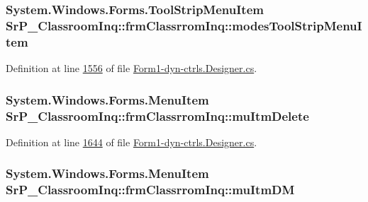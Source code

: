 \hypertarget{class_sr_p___classroom_inq_1_1frm_classrrom_inq_a8eef2c0ef527338feb8e51e6ddef9cc1}{
\subsubsection[{modes\-Tool\-Strip\-Menu\-Item}]{\setlength{\rightskip}{0pt plus 5cm}\-System.\-Windows.\-Forms.\-Tool\-Strip\-Menu\-Item {\bf \-Sr\-P\-\_\-\-Classroom\-Inq\-::frm\-Classrrom\-Inq\-::modes\-Tool\-Strip\-Menu\-Item}}}
\label{class_sr_p___classroom_inq_1_1frm_classrrom_inq_a8eef2c0ef527338feb8e51e6ddef9cc1}


\-Definition at line \hyperlink{_form1-dyn-ctrls_8_designer_8cs_source_l01556}{1556} of file \hyperlink{_form1-dyn-ctrls_8_designer_8cs_source}{\-Form1-\/dyn-\/ctrls.\-Designer.\-cs}.

\hypertarget{class_sr_p___classroom_inq_1_1frm_classrrom_inq_afb6bae444aa0f2084f3d447454a29e47}{
\subsubsection[{mu\-Itm\-Delete}]{\setlength{\rightskip}{0pt plus 5cm}\-System.\-Windows.\-Forms.\-Menu\-Item {\bf \-Sr\-P\-\_\-\-Classroom\-Inq\-::frm\-Classrrom\-Inq\-::mu\-Itm\-Delete}}}
\label{class_sr_p___classroom_inq_1_1frm_classrrom_inq_afb6bae444aa0f2084f3d447454a29e47}


\-Definition at line \hyperlink{_form1-dyn-ctrls_8_designer_8cs_source_l01644}{1644} of file \hyperlink{_form1-dyn-ctrls_8_designer_8cs_source}{\-Form1-\/dyn-\/ctrls.\-Designer.\-cs}.

\hypertarget{class_sr_p___classroom_inq_1_1frm_classrrom_inq_a1ab66b5e5506390fd7dab2fae510c610}{
\subsubsection[{mu\-Itm\-D\-M}]{\setlength{\rightskip}{0pt plus 5cm}\-System.\-Windows.\-Forms.\-Menu\-Item {\bf \-Sr\-P\-\_\-\-Classroom\-Inq\-::frm\-Classrrom\-Inq\-::mu\-Itm\-D\-M}}}
\label{class_sr_p___classroom_inq_1_1frm_classrrom_inq_a1ab66b5e5506390fd7dab2fae510c610}


